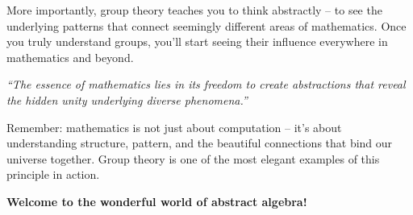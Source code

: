 \documentclass[12pt]{article}
\begin{document}
More importantly, group theory teaches you to think abstractly – to see the underlying patterns that connect seemingly different areas of mathematics. Once you truly understand groups, you'll start seeing their influence everywhere in mathematics and beyond.

\begin{center}
\large\textit{\textcolor{richpurple}{``The essence of mathematics lies in its freedom to create abstractions that reveal the hidden unity underlying diverse phenomena.''}}
\end{center}

Remember: mathematics is not just about computation – it's about understanding structure, pattern, and the beautiful connections that bind our universe together. Group theory is one of the most elegant examples of this principle in action.

\textcolor{deepmintgreen}{\textbf{Welcome to the wonderful world of abstract algebra!}}
\end{document}
